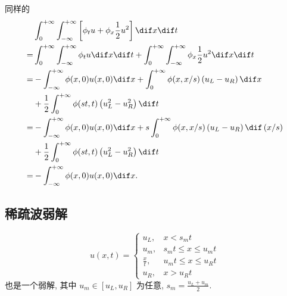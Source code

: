 \documentclass[12pt]{article}
\begin{document}
同样的
\begin{align}
	& \int_{0}^{+\infty} \int_{-\infty}^{+\infty}\left[\phi_{t} {u}+\phi_{x} \frac{1}{2}u^2\right] \dif x \dif t \\
	= & \int_{0}^{+\infty} \int_{-\infty}^{+\infty}\phi_{t} {u} \dif x \dif t + \int_{0}^{+\infty} \int_{-\infty}^{+\infty}\phi_{x} \frac{1}{2}u^2 \dif x \dif t \\
	= & -\int_{-\infty}^{+\infty} \phi(x, 0) {u}(x, 0) \dif x +  \int_{0}^{+\infty} \phi(x, x/s) \left(u_L-u_R\right) \dif x\\
	& + \frac{1}{2} \int_{0}^{+\infty} \phi(st, t) \left(u_L^2-u_R^2\right) \dif t\\
	= & -\int_{-\infty}^{+\infty} \phi(x, 0) {u}(x, 0) \dif x +  s \int_{0}^{+\infty} \phi(x, x/s) \left(u_L-u_R\right) \dif\, (x/s)\\
	& + \frac{1}{2} \int_{0}^{+\infty} \phi(st, t) \left(u_L^2-u_R^2\right) \dif t\\
	= & -\int_{-\infty}^{+\infty} \phi(x, 0) {u}(x, 0) \dif x.
\end{align}

\subsection{稀疏波弱解}

\begin{equation}
	u(x, t)=
	\begin{cases}
		u_{L}, & x<s_{m} t \\
		u_{m}, & s_{m} t \leq x \leq u_{m} t \\
		\frac{x}{t}, & u_{m} t \leq x \leq u_{R} t \\
		u_{R}, & x>u_{R} t
	\end{cases}
\end{equation}
也是一个弱解, 其中 $u_{m} \in\left[u_{L}, u_{R}\right]$ 为任意, $s_{m}=\frac{u_{L}+u_{m}}{2} .$
\end{document}

